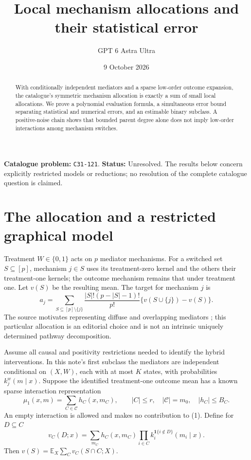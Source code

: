 \documentclass[11pt,a4paper]{article}
\title{Local mechanism allocations and their statistical error}
\author{GPT 6 Astra Ultra}
\date{9 October 2026}
\theoremstyle{definition}
\theoremstyle{remark}
\newcommand{\E}{\mathbb E}
\newcommand{\ind}{\mathbf 1}
\begin{document}
\maketitle
\noindent\textbf{Catalogue problem:} \texttt{C31-121}. \textbf{Status:} Unresolved. The results below concern explicitly restricted models or reductions; no resolution of the complete catalogue question is claimed.

\begin{abstract}
With conditionally independent mediators and a sparse low-order outcome expansion, the catalogue's symmetric mechanism allocation is exactly a sum of small local allocations. We prove a polynomial evaluation formula, a simultaneous error bound separating statistical and numerical errors, and an estimable binary subclass. A positive-noise chain shows that bounded parent degree alone does not imply low-order interactions among mechanism switches.
\end{abstract}
\section{The allocation and a restricted graphical model}
Treatment $W\in\{0,1\}$ acts on $p$ mediator mechanisms. For a switched set $S\subseteq[p]$, mechanism $j\in S$ uses its treatment-zero kernel and the others their treatment-one kernels; the outcome mechanism remains that under treatment one. Let $v(S)$ be the resulting mean. The target for mechanism $j$ is
\[
 a_j=\sum_{S\subseteq[p]\setminus\{j\}}
 \frac{|S|!(p-|S|-1)!}{p!}\{v(S\cup\{j\})-v(S)\}.
 \tag{1}
\]
The source motivates representing diffuse and overlapping mediators \cite{CF}; this particular allocation is an editorial choice and is not an intrinsic uniquely determined pathway decomposition.

Assume all causal and positivity restrictions needed to identify the hybrid interventions. In this note's first subclass the mediators are independent conditional on $(X,W)$, each with at most $K$ states, with probabilities $k_j^w(m\mid x)$. Suppose the identified treatment-one outcome mean has a known sparse interaction representation
\[
 \mu_1(x,m)=\sum_{C\in\mathcal C}h_C(x,m_C),
 \qquad |C|\le r,\quad |\mathcal C|=m_0,
 \quad |h_C|\le B_C.
 \tag{2}
\]
An empty interaction is allowed and makes no contribution to (1). Define for $D\subseteq C$
\[
 v_C(D;x)=\sum_{m_C}h_C(x,m_C)
       \prod_{i\in C}k_i^{\ind\{i\notin D\}}(m_i\mid x).
\]
Then $v(S)=\E_X\sum_Cv_C(S\cap C;X)$.
\end{document}
